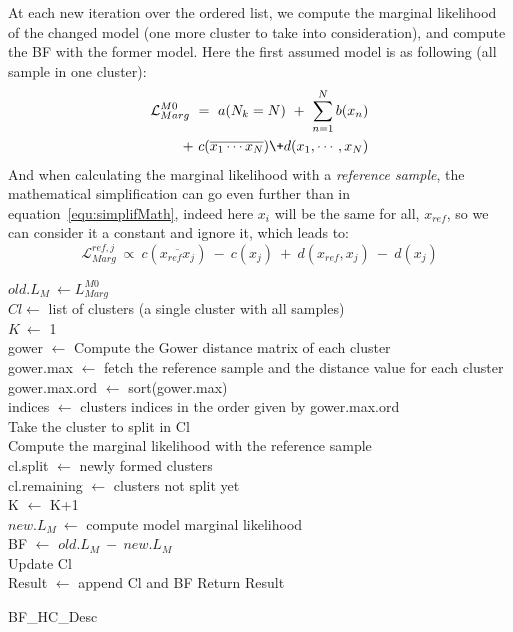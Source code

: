 \documentclass[twocolumn,12pt]{article}
\begin{document}
At each new iteration over the ordered list, we compute the marginal likelihood of the changed model (one more cluster to take into consideration), and compute the BF with the former model.
Here the first assumed model is as following (all sample in one cluster):
\begin{align}
    \mathcal{L}_{Marg}^{M0}\ =\ a(N_k=N)\ +\ \sum_{n=1}^Nb(x_n)\nonumber\\ 
    +\ c(\overline{x_1\cdots x_N})\+d(x_1,\cdots,x_N)
\end{align}
And when calculating the marginal likelihood with a \emph{reference sample}, the mathematical simplification can go even further than in equation~\ref{equ:simplifMath}, indeed here $x_i$ will be the same for all, $x_{ref}$, so we can consider it a constant and ignore it, which leads to:
\begin{equation}
    \mathcal{L}_{Marg}^{ref,j}\ \propto\ c(\overline{x_{ref}x_j})\ -\ c(x_j)\ +\ d(x_{ref},x_j)\ -\ d(x_j)
\end{equation}
\begin{algorithm}[!]
 \BlankLine
 $old.L_M\ \leftarrow L_{Marg}^{M0}$\\
 $Cl \leftarrow$ list of clusters (a single cluster with all samples)\\
 $K\ \leftarrow$ 1\\
 \BlankLine
    {
        gower $\leftarrow$ Compute the Gower distance matrix of each cluster\\
        gower.max $\leftarrow$ fetch the reference sample and the distance value for each cluster\\
        gower.max.ord $\leftarrow$ sort(gower.max)\\
        indices $\leftarrow$ clusters indices in the order given by gower.max.ord\\
        {
            Take the cluster to split in Cl\\
            Compute the marginal likelihood with the reference sample\\
            cl.split $\leftarrow$ newly formed clusters\\
            cl.remaining $\leftarrow$ clusters not split yet\\
            K $\leftarrow$ K+1\\
            $new.L_M\ \leftarrow$ compute model marginal likelihood\\
            BF $\leftarrow$ $old.L_M\ -\ new.L_M$\\
            Update Cl\\
            Result $\leftarrow$ append Cl and BF
        }
    }
    Return Result
 \caption{BF\_HC\_Desc}
\end{algorithm}
\end{document}
